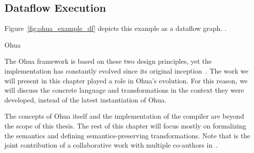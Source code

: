 \subsection{Dataflow Execution}
\label{sec:ohua_dataflow}


Figure~\ref{fig:ohua_example_df} depicts this example as a dataflow graph.
.


Ohua

The Ohua framework is based on these two design principles, yet the implementation has constantly evolved since its original inception~\cite{ertel2014framework}.
The work we will present in this chapter played a role in Ohua's evolution.
For this reason, we will discuss the concrete language and transformations in the context they were developed, instead of the latest instantiation of Ohua.

The concepts of Ohua itself and the implementation of the compiler are beyond the scope of this thesis. 
The rest of this chapter will focus mostly on formalizing the semantics and defining semantics-preserving transformations. 
Note that is the joint contribution of a collaborative work with multiple co-authors in~\cite{goens_multiprog18,ertel_cc18,ertel_haskell19,ertel_haskellsup19}.